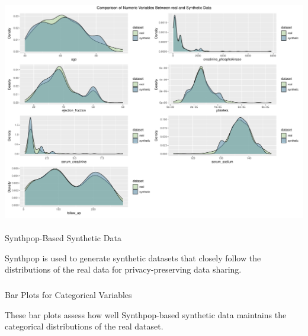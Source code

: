 \documentclass[
  letterpaper,
  DIV=11,
  numbers=noendperiod]{scrartcl}
\makeatletter
\let\oldparagraph\paragraph
\renewcommand{\paragraph}{
    \@ifstar
      \xxxParagraphStar
      \xxxParagraphNoStar
  }
\newcommand{\xxxParagraphStar}[1]{\oldparagraph*{#1}\mbox{}}
\newcommand{\xxxParagraphNoStar}[1]{\oldparagraph{#1}\mbox{}}
\let\oldsubparagraph\subparagraph
\renewcommand{\subparagraph}{
    \@ifstar
      \xxxSubParagraphStar
      \xxxSubParagraphNoStar
  }
\newcommand{\xxxSubParagraphStar}[1]{\oldsubparagraph*{#1}\mbox{}}
\newcommand{\xxxSubParagraphNoStar}[1]{\oldsubparagraph{#1}\mbox{}}
\makeatother
\begin{document}
\begin{center}
\includegraphics[width=1\linewidth,height=\textheight,keepaspectratio]{heart_failure_synthetic_data_project_files/figure-pdf/Density plots for numeric variables (CART-imputed data)-1.pdf}
\end{center}

\paragraph{Synthpop-Based Synthetic
Data}\label{synthpop-based-synthetic-data-1}

Synthpop is used to generate synthetic datasets that closely follow the
distributions of the real data for privacy-preserving data sharing.

\subparagraph{Bar Plots for Categorical
Variables}\label{bar-plots-for-categorical-variables-2}

These bar plots assess how well Synthpop-based synthetic data maintains
the categorical distributions of the real dataset.
\end{document}
